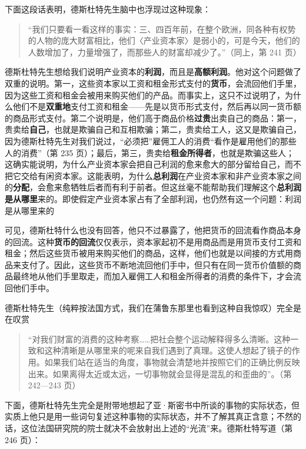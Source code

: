 下面这段话表明，德斯杜特先生脑中也浮现过这种现象：

\begin{quote}“我们只要看一看这样的事实：三、四百年前，在整个欧洲，同各种有权势的人物的庞大财富相比，他们〈产业资本家〉是弱小的，可是今天，他们的人数增加了，力量增强了，而那些人的财富却减少了。”（同上，第 241 页）\end{quote}

德斯杜特先生想给我们说明产业资本的\textbf{利润}，而且是\textbf{高额利润}。他对这个问题做了双重的说明。第一，这些资本家以工资和租金形式支付的\textbf{货币}，会流回他们手里，因为这些工资和租金会被用来购买他们的产品。而事实上，这只不过说明了，为什么他们不是\textbf{双重地}支付工资和租金——先是以货币形式支付，然后再以同一货币额的商品形式支付。第二个说明是，他们高于商品价格\textbf{过贵}出卖自己的商品：第一，贵卖给\textbf{自己}，也就是欺骗自己和互相欺骗；第二，贵卖给工人，这又是欺骗自己，因为德斯杜特先生对我们说过，“必须把”雇佣工人的消费“看作是雇用他们的那些人的消费”（第 235 页）；最后，第三，贵卖给\textbf{租金所得者}，也就是欺骗这些人；这确实能说明，为什么产业资本家会把自己利润的愈来愈大的部分留给自己，而不把它交给有闲资本家。这能表明，为什么\textbf{总利润}在产业资本家和非产业资本家之间的\textbf{分配}，会愈来愈牺牲后者而有利于前者。但这丝毫不能帮助我们理解这个\textbf{总利润是从哪里}来的。即使假定产业资本家占有了全部利润，也仍然有这一个问题：利润是从哪里来的

可见，德斯杜特什么也没有回答，他只不过暴露了，他把货币的回流看作商品本身的回流。这种\textbf{货币的回流}仅仅表示，资本家起初不是用商品而是用货币支付工资和租金；然后这些货币被用来购买他们的商品，这样，他们也就是以间接的方式用商品来支付了。因此，这些货币不断地流回他们手中，但只有在同一货币价值额的商品最终地从他们手里取走，而加入雇佣工人和租金所得者的消费的条件下，才会流回他们手中。

德斯杜特先生（纯粹按法国方式，我们在蒲鲁东那里也看到这种自我惊叹）完全是在叹赏

\begin{quote}“对我们财富的消费的这种考察……把社会整个运动解释得多么清晰。这种一致和这种清晰是从哪里来的呢来自我们遇到了真理。这使人想起了镜子的作用。如果我们站在适当的角度，事物就会清楚地并按照它们的正确比例反映出来。如果离得太近或太远，一切事物就会显得是混乱的和歪曲的”。（第 242—243 页）\end{quote}

下面，德斯杜特先生完全是附带地想起了亚·斯密书中所谈的事物的实际状态，但实质上他只是用一些词句复述这种事物的实际状态，并不了解其真正含意；不然的话，这位法国研究院的院士就决不会放射出上述的“光流”来。德斯杜特写道（第 246 页）：

